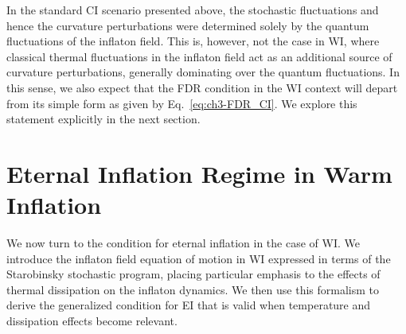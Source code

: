 In the standard CI scenario presented above, the stochastic fluctuations and hence the curvature perturbations were determined solely by the quantum fluctuations of the inflaton field.
This is, however, not the case in WI, where classical thermal fluctuations in the inflaton field act as an additional source of
curvature perturbations, generally dominating over the quantum fluctuations. In this sense, we also expect that the FDR condition in
the WI context  will depart from its simple form as given by
Eq.~\ref{eq:ch3-FDR_CI}.  We explore this statement explicitly in the next section.


\section{Eternal Inflation Regime in Warm Inflation}
\label{sec:ch3-EIWI}

We now turn to the condition for eternal inflation in the case of WI. We introduce the inflaton field equation of motion in WI expressed in terms of the Starobinsky stochastic program, placing particular emphasis to the effects of thermal dissipation on the inflaton dynamics. We then use this formalism to derive the generalized condition for EI that is valid when temperature and dissipation effects become relevant.

